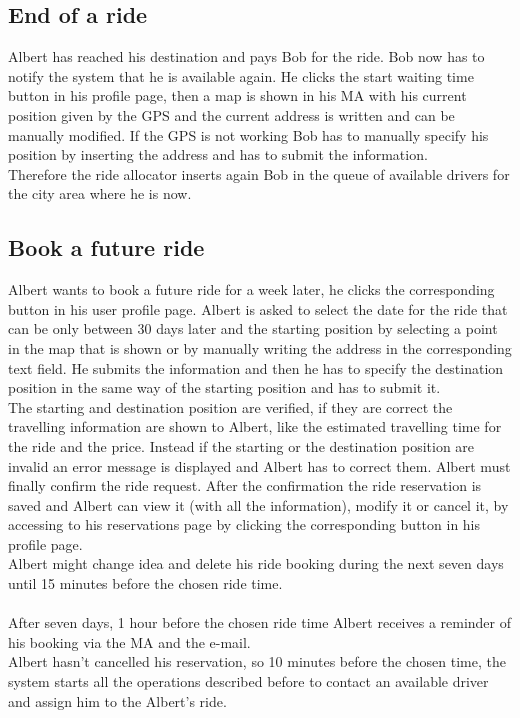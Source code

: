 \subsection{End of a ride}
Albert has reached his destination and pays Bob for the ride. Bob now has to notify the system that he is available again. He clicks the start waiting time button in his profile page, then a map is shown in his MA with his current position given by the GPS and the current address is written and can be manually modified. If the GPS is not working Bob has to manually specify his position by inserting the address and has to submit the information.\\
Therefore the ride allocator inserts again Bob in the queue of available drivers for the city area where he is now.

\subsection{Book a future ride}
Albert wants to book a future ride for a week later, he clicks the corresponding button in his user profile page. Albert is asked to select the date for the ride that can be only between 30 days later and the starting position by selecting a point in the map that is shown or by manually writing the address in the corresponding text field. He submits the information and then he has to specify the destination position in the same way of the starting position and has to submit it.\\
The starting and destination position are verified, if they are correct the travelling information are shown to Albert, like the estimated travelling time for the ride and the price. Instead if the starting or the destination position are invalid an error message is displayed and Albert has to correct them. Albert must finally confirm the ride request. 
After the confirmation the ride reservation is saved and Albert can view it (with all the information), modify it or cancel it, by accessing to his reservations page by clicking the corresponding button in his profile page.\\
Albert might change idea and delete his ride booking during the next seven days until 15 minutes before the chosen ride time.\\
\\
After seven days, 1 hour before the chosen ride time Albert receives a reminder of his booking via the MA and the e-mail.\\
Albert hasn't cancelled his reservation, so 10 minutes before the chosen time, the system starts all the operations described before to contact an available driver and assign him to the Albert's ride.

